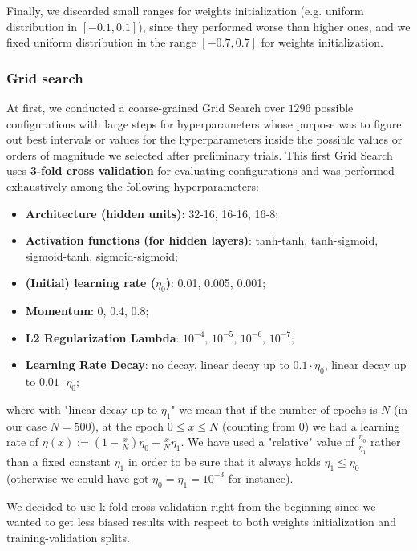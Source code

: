Finally, we discarded small ranges for weights initialization (e.g. uniform distribution in $[-0.1, 0.1]$), since they performed worse than higher ones,
and we fixed uniform distribution in the range $[-0.7, 0.7]$ for weights initialization.

\subsubsection{Grid search}

At first, we conducted a coarse-grained Grid Search over $1296$ possible configurations with large steps for hyperparameters whose purpose was to figure out best intervals or values for the hyperparameters inside the possible values or orders of magnitude we selected after preliminary trials. This first Grid Search uses \textbf{3-fold cross validation} for evaluating configurations and was performed exhaustively among the following hyperparameters:
\begin{itemize}
    \item \textbf{Architecture (hidden units)}: 32-16, 16-16, 16-8;
    \item \textbf{Activation functions (for hidden layers)}: tanh-tanh, tanh-sigmoid, sigmoid-tanh, sigmoid-sigmoid;
    \item \textbf{(Initial) learning rate ($\eta_0$)}: 0.01, 0.005, 0.001;
    \item \textbf{Momentum}: 0, 0.4, 0.8;
    \item \textbf{L2 Regularization Lambda}: $10^{-4}$, $10^{-5}$, $10^{-6}$, $10^{-7}$;
    \item \textbf{Learning Rate Decay}: no decay, linear decay up to $0.1 \cdot \eta_0$, linear decay up to $0.01 \cdot \eta_0$;
\end{itemize}

where with "linear decay up to $\eta_1$" we mean that if the number of epochs is $N$ (in our case $N = 500$), at the epoch $0 \leq x \le N$ (counting from $0$) we had a learning rate of $\eta(x) := \left(1 - \frac{x}{N}\right)\eta_0 + \frac{x}{N} \eta_1$. We have used a "relative" value of $\frac{\eta_0}{\eta_1}$ rather than a fixed constant $\eta_1$ in order to be sure that it always holds $\eta_1 \leq \eta_0$ (otherwise we could have got $\eta_0 = \eta_1 = 10^{-3}$ for instance).

We decided to use k-fold cross validation right from the beginning since we wanted to get less biased results with respect to both weights initialization and training-validation splits.

